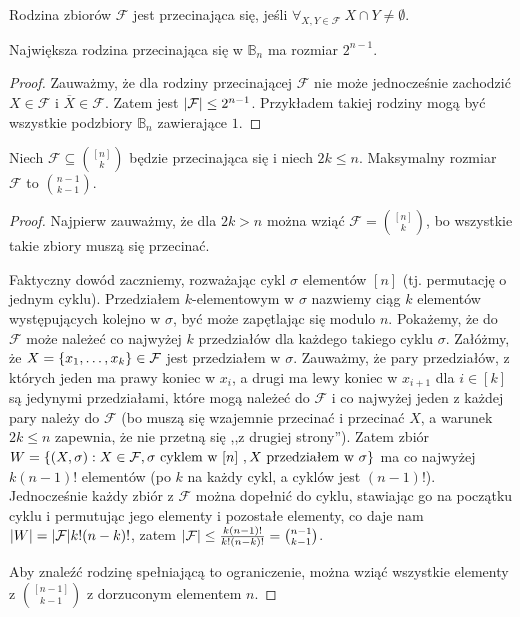 \begin{definition}
	Rodzina zbiorów \(\mathcal F\) jest przecinająca się, jeśli \(\forall_{X, Y\in \mathcal F} \ X \cap Y \neq \emptyset\).
\end{definition}

\begin{theorem}
	Największa rodzina przecinająca się w \(\mathbb B_n\) ma rozmiar \(2^{n-1}\).
\end{theorem}
\begin{proof}
	Zauważmy, że dla rodziny przecinającej \(\mathcal F\) nie może jednocześnie
	zachodzić \(X\in\mathcal F\) i \(\overline X\in\mathcal F\). Zatem jest
	\(\card{\mathcal F}\le 2^{n-1}\). Przykładem takiej rodziny mogą być wszystkie
	podzbiory \(\mathbb B_n\) zawierające \(1\).
\end{proof}

\begin{theorem}
	Niech \(\mathcal F\subseteq \binom{[n]}{k}\) będzie przecinająca się i niech
	\(2k\le n\). Maksymalny rozmiar \(\mathcal F\) to \(\binom{n-1}{k-1}\).
\end{theorem}
\begin{proof}
	Najpierw zauważmy, że dla \(2k>n\) można wziąć \(\mathcal F = \binom{[n]}{k}\), bo
	wszystkie takie zbiory muszą się przecinać.

	Faktyczny dowód zaczniemy, rozważając cykl \(\sigma\) elementów
	\([n]\) (tj. permutację o jednym cyklu). Przedziałem \(k\)-elementowym w \(\sigma\)
	nazwiemy ciąg \(k\) elementów występujących kolejno w \(\sigma\), być może zapętlając
	się modulo \(n\). Pokażemy, że do \(\mathcal F\) może należeć co najwyżej \(k\)
	przedziałów dla każdego takiego cyklu \(\sigma\).
	Załóżmy, że \(X=\set{x_1,\ldots,x_k}\in\mathcal
	F\) jest przedziałem w \(\sigma.\) Zauważmy, że pary przedziałów, z których
	jeden ma prawy koniec w \(x_i\), a drugi ma lewy koniec w \(x_{i+1}\) dla \(i\in
	[k]\) są jedynymi przedziałami, które mogą należeć do \(\mathcal F\) i co
	najwyżej jeden z każdej pary należy do \(\mathcal F\) (bo muszą się wzajemnie
	przecinać i przecinać \(X\), a warunek \(2k\le n\) zapewnia, że
	nie przetną się ,,z drugiej strony''). Zatem zbiór
	\(W = \set{(X,\sigma) : X\in\mathcal F, \sigma \text{ cyklem w $[n]$ }, X \text{ przedziałem w
			$\sigma$}}\) ma co najwyżej \(k(n-1)!\) elementów (po \(k\) na każdy cykl, a cyklów jest \((n-1)!\)).
	Jednocześnie każdy zbiór z \(\mathcal F\) można dopełnić do cyklu, stawiając go
	na początku cyklu i permutując jego elementy i pozostałe elementy, co daje nam
	\(\card W = \card{\mathcal F}k!(n-k)!\), zatem \(\card{\mathcal F} \le
	\frac{k(n-1)!}{k!(n-k)!} = \binom{n-1}{k-1}\).

	Aby znaleźć rodzinę spełniającą to ograniczenie, można wziąć wszystkie elementy z
	\(\displaystyle\binom{[n-1]}{k-1}\) z dorzuconym elementem \(n\).
\end{proof}

